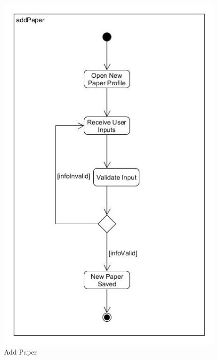 \documentclass[a4paper,12pt]{article}
\begin{document}
\begin{figure}[H]
    \centering
    \caption{Add Paper}
    \includegraphics[width=1\textwidth]{process-spec/Activity_AddPaper.jpg}
\end{figure}
\end{document}
